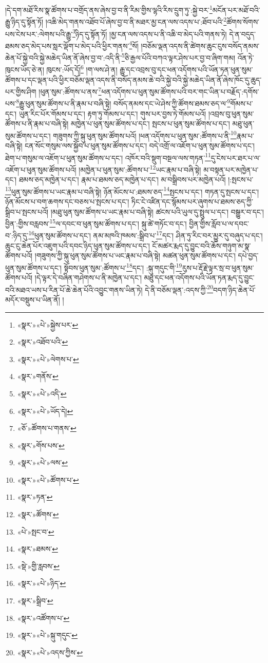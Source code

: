 །དེ་དག་མཐོ་རིས་སྣ་ཚོགས་པ་བགྲོད་ནས་ཞེས་བྱ་བ་ནི་རིམ་གྱིས་ལྷའི་རིས་དྲུག་ཏུ་:སྐྱེ་བར་\footnote{«སྣར་»«པེ་»སྐྱེས་པར་}མངོན་པར་མཐོ་བའི་རྒྱུ་ཉིད་དུ་སྟོན་ཏོ། །འཆི་མེད་གནས་འཐོབ་པོ་ཞེས་བྱ་བ་ནི་མཐར་མྱ་ངན་ལས་འདས་པ་:ཐོབ་པའི་\footnote{«སྣར་»འཐོབ་པའི་}ཚོགས་སོགས་པས་ངེས་པར་:ལེགས་པའི་རྒྱུ་\footnote{«སྣར་»«པེ་»ལེགས་པ་}ཉིད་དུ་སྟོན་ཏོ། །མྱ་ངན་ལས་འདས་པ་ནི་འཆི་བ་མེད་པའི་གནས་ཏེ། དེ་ན་བདུད་ཐམས་ཅད་མེད་པས་སླར་ལྡོག་པ་མེད་པའི་ཕྱིར་གནས་\footnote{«སྣར་»གནོས་}སོ། །བཅོམ་ལྡན་འདས་ནི་ཚེགས་ཆུང་ངུས་བསོད་ནམས་ཆེན་པོ་སྐྱེ་བའི་སྐྱེ་མཆེད་ཡིན་ནོ་ཞེས་བྱ་བ་:འདི་ནི་\footnote{«སྣར་»«པེ་»འདི་}ཅི་རྒྱལ་པོའི་བཀའ་ལྟར་ཤེས་པར་བྱ་བ་ཞིག་གམ། འོན་ཏེ་ཁུངས་ཡོད་ཅེ་ན། ཁུངས་:ཡོད་དོ།\footnote{«སྣར་»«པེ་»ཡོད་དེ།} །ག་ལས་ཤེ་ན། རྒྱུ་དང་འབྲས་བུ་དང་ཕན་འདོགས་པའི་ཡོན་ཏན་ཕུན་སུམ་ཚོགས་པ་དང་ལྡན་པའི་ཕྱིར་བཅོམ་ལྡན་འདས་ནི་བསོད་ནམས་ཆེ་བའི་སྐྱེ་བའི་སྐྱེ་མཆེད་ཡིན་ནོ་ཞེས་ཁོང་དུ་ཆུད་པར་གྱིས་ཤིག །ཕུན་སུམ་:ཚོགས་པ་ནས་\footnote{«ཅོ་»ཚོགས་པ་གནས་}ཕན་འདོགས་པ་ཕུན་སུམ་ཚོགས་པའི་བར་གང་ཡིན་པ་བརྗོད་:དགོས་པས་\footnote{«སྣར་»གོས་པས་}རྒྱུ་ཕུན་སུམ་ཚོགས་པ་ནི་རྣམ་པ་བཞི་སྟེ། བསོད་ནམས་དང་ཡེ་ཤེས་ཀྱི་ཚོགས་ཐམས་ཅད་ལ་\footnote{«སྣར་»«པེ་»ལས་}གོམས་པ་དང་། ཡུན་རིང་པོར་གོམས་པ་དང་། རྟག་ཏུ་གོམས་པ་དང་། གུས་པར་བྱས་ཏེ་གོམས་པའོ། །འབྲས་བུ་ཕུན་སུམ་ཚོགས་པ་ནི་རྣམ་པ་བཞི་སྟེ། མཁྱེན་པ་ཕུན་སུམ་ཚོགས་པ་དང་། སྤངས་པ་ཕུན་སུམ་ཚོགས་པ་དང་། མཐུ་ཕུན་སུམ་ཚོགས་པ་དང་། གཟུགས་ཀྱི་སྐུ་ཕུན་སུམ་ཚོགས་པའོ། །ཕན་འདོགས་པ་ཕུན་སུམ་:ཚོགས་པ་ནི་\footnote{«སྣར་»«པེ་»ཚོགས་པ་}རྣམ་པ་བཞི་སྟེ། ངན་སོང་གསུམ་ལས་སྐྱོབ་པ་ཕུན་སུམ་ཚོགས་པ་དང་། བདེ་འགྲོ་ལ་འཇོག་པ་ཕུན་སུམ་ཚོགས་པ་དང་། ཐེག་པ་གསུམ་ལ་འཇོག་པ་ཕུན་སུམ་ཚོགས་པ་དང་། འཁོར་བའི་སྡུག་བསྔལ་ལས་གཏན་\footnote{«སྣར་»ཏན་}དུ་ངེས་པར་ཐར་པ་ལ་འཇོག་པ་ཕུན་སུམ་ཚོགས་པའོ། །མཁྱེན་པ་ཕུན་སུམ་:ཚོགས་པ་\footnote{«སྣར་»ཚོགས་}ཡང་རྣམ་པ་བཞི་སྟེ། མ་བསྟན་པར་མཁྱེན་པ་དང་། ཐམས་ཅད་མཁྱེན་པ་དང་། རྣམ་པ་ཐམས་ཅད་མཁྱེན་པ་དང་། མ་བསྒྲིབས་པར་མཁྱེན་པའོ། །:སྤངས་པ་\footnote{«པེ་»སྤང་བ་}ཕུན་སུམ་ཚོགས་པ་ཡང་རྣམ་པ་བཞི་སྟེ། ཉོན་མོངས་པ་:ཐམས་ཅད་\footnote{«སྣར་»ཐམས་}སྤངས་པ་དང་། གཏན་དུ་སྤངས་པ་དང་། ཉོན་མོངས་པ་བག་ཆགས་དང་བཅས་པ་སྤངས་པ་དང་། ཏིང་ངེ་འཛིན་དང་སྙོམས་པར་ཞུགས་པ་ཐམས་ཅད་ཀྱི་སྒྲིབ་པ་སྤངས་པའོ། །མཐུ་ཕུན་སུམ་ཚོགས་པ་ཡང་རྣམ་པ་བཞི་སྟེ། ཚངས་པའི་ཡུལ་དུ་སྤྲུལ་པ་དང་། བསྒྱུར་བ་དང་། བྱིན་:གྱིས་བརླབས་\footnote{«སྡེ་»གྱི་རླབས་}ལ་དབང་བ་ཕུན་སུམ་ཚོགས་པ་དང་། སྐུ་ཚེ་གཏོང་བ་དང་། བྱིན་གྱིས་རློབ་པ་ལ་དབང་བ་:ཉིད་དུ་\footnote{«སྣར་»«པེ་»ཉིད་}ཕུན་སུམ་ཚོགས་པ་དང་། ནམ་མཁའི་ཁམས་:སྒྲིབ་པ་\footnote{«སྣར་»སྒྲིབ་}དང་། ཤིན་ཏུ་རིང་བར་མྱུར་དུ་བཞུད་པ་དང་། ཆུང་ངུ་ཆེན་པོར་འཇུག་པའི་དབང་ཉིད་ཕུན་སུམ་ཚོགས་པ་དང་། ངོ་མཚར་རྨད་དུ་བྱུང་བའི་ཆོས་གཉུག་མ་སྣ་ཚོགས་པའོ། །གཟུགས་ཀྱི་སྐུ་ཕུན་སུམ་ཚོགས་པ་ཡང་རྣམ་པ་བཞི་སྟེ། མཚན་ཕུན་སུམ་ཚོགས་པ་དང་། དཔེ་བྱད་ཕུན་སུམ་ཚོགས་པ་དང་། སྟོབས་ཕུན་སུམ་:ཚོགས་པ་\footnote{«སྣར་»འཚོགས་པ་}དང་། :སྐུ་གདུང་གི་\footnote{«སྣར་»«པེ་»སྐུ་གདུང་}རུས་པ་རྡོ་རྗེ་ལྟར་སྲ་བ་ཕུན་སུམ་ཚོགས་པའོ། །དེ་ལྟར་དེ་བཞིན་གཤེགས་པ་ནི་མཁྱེན་པ་དང་། མཐུ་དང་ཕན་འདོགས་པའི་ཡོན་ཏན་རྨད་དུ་བྱུང་བའི་མཐའ་ཡས་པ་རིན་པོ་ཆེ་ཆེན་པོའི་འབྱུང་གནས་ཡིན་ཏེ། དེ་ནི་བཅོམ་ལྡན་:འདས་ཀྱི་\footnote{«སྣར་»«པེ་»འདས་ཀྱིས་}བདག་ཉིད་ཆེན་པོ་མདོར་བསྡུས་པ་ཡིན་ནོ། །
